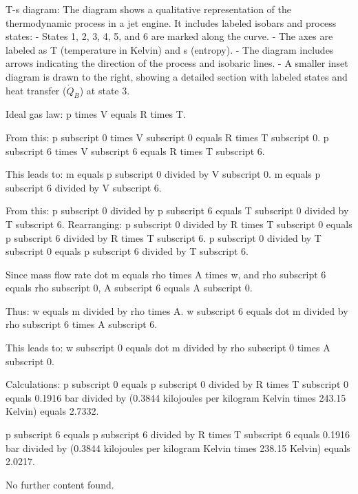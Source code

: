 T-s diagram:  
The diagram shows a qualitative representation of the thermodynamic process in a jet engine. It includes labeled isobars and process states:  
- States 1, 2, 3, 4, 5, and 6 are marked along the curve.  
- The axes are labeled as T (temperature in Kelvin) and s (entropy).  
- The diagram includes arrows indicating the direction of the process and isobaric lines.  
- A smaller inset diagram is drawn to the right, showing a detailed section with labeled states and heat transfer (\( \dot{Q}_B \)) at state 3.

Ideal gas law:  
p times V equals R times T.  

From this:  
p subscript 0 times V subscript 0 equals R times T subscript 0.  
p subscript 6 times V subscript 6 equals R times T subscript 6.  

This leads to:  
m equals p subscript 0 divided by V subscript 0.  
m equals p subscript 6 divided by V subscript 6.  

From this:  
p subscript 0 divided by p subscript 6 equals T subscript 0 divided by T subscript 6.  
Rearranging:  
p subscript 0 divided by R times T subscript 0 equals p subscript 6 divided by R times T subscript 6.  
p subscript 0 divided by T subscript 0 equals p subscript 6 divided by T subscript 6.  

Since mass flow rate dot m equals rho times A times w, and rho subscript 6 equals rho subscript 0, A subscript 6 equals A subscript 0.  

Thus:  
w equals m divided by rho times A.  
w subscript 6 equals dot m divided by rho subscript 6 times A subscript 6.  

This leads to:  
w subscript 0 equals dot m divided by rho subscript 0 times A subscript 0.  

Calculations:  
p subscript 0 equals p subscript 0 divided by R times T subscript 0 equals 0.1916 bar divided by (0.3844 kilojoules per kilogram Kelvin times 243.15 Kelvin) equals 2.7332.  

p subscript 6 equals p subscript 6 divided by R times T subscript 6 equals 0.1916 bar divided by (0.3844 kilojoules per kilogram Kelvin times 238.15 Kelvin) equals 2.0217.  

No further content found.